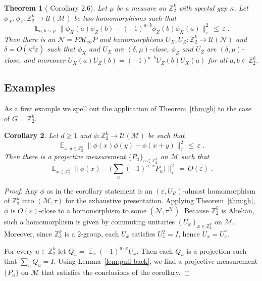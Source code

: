 \documentclass[11pt]{article}
\newtheorem{theorem}{Theorem}[section]
\newtheorem{corollary}[theorem]{Corollary}
\theoremstyle{definition}
\newcommand{\Id}{\ensuremath{I}}
\DeclareMathOperator*{\Expectation}{\mathbb{E}}
\newcommand{\Es}[1]{\Expectation_{#1}}
\newcommand{\C}{\ensuremath{\mathbb{C}}}
\newcommand{\Z}{\ensuremath{\mathbb{Z}}}
\newcommand{\mM}{\ensuremath{\mathcal{M}}}
\newcommand{\mU}{\ensuremath{\mathcal{U}}}
\newcommand{\eps}{\varepsilon}
\newcommand{\mN}{\mathcal{N}}
\begin{document}

\begin{theorem}[\cite{de2022spectral} Corollary 2.6]\label{thm:dls-gap}
Let $\mu$ be a measure on $\Z_2^k$ with spectal gap $\kappa$. Let $\phi_X,\phi_Z: \Z_2^k \to \mU(\mM)$ be two homomorphisms such that
\[ \Es{a,b\sim \mu} \big\| \phi_X(a)\phi_Z(b)-(-1)^{a\cdot b} \phi_Z(b)\phi_X(a)\big\|_\tau^2 \,\leq\,\eps\;.\]
Then there is an $\mN=P\mM_\infty P$ and homomorphisms $U_X,U_Z:\Z_2^k\to\mU(\mN)$ and $\delta=O(\kappa^2\eps)$ such that $\phi_X$ and $U_X$ are $(\delta,\mu)$-close, $\phi_Z$ and $U_Z$ are $(\delta,\mu)$-close, and moreover $U_X(a)U_Z(b)=(-1)^{a\cdot b}U_Z(b)U_X(a)$ for all $a,b\in\Z_2^k$.
\end{theorem}




\subsection{Examples}

As a first example we spell out the application of Theorem~\ref{thm:gh} to the case of $G=\Z_2^k$. 

\begin{corollary}\label{cor:lin-test} %
Let $d\geq 1$ and $\phi:\Z_2^k \to \mU(\mM)$ be such that 
\[ \Es{x,y\in \Z_2^k} \big\| \phi(x)\phi(y)-\phi(x+y) \big\|_{\tau}^2 \,\leq\,\eps\;.\]
Then there is a %
projective measurement $\{P_u\}_{u\in \Z_2^k}$ on $\mM$ such that 
\[ \Es{x\in \Z_2^k} \Big\| \phi(x) -\Big(\sum_u (-1)^{u\cdot x} P_u\Big)  \Big\|_{\tau}^2 \,=\, O(\eps)\;.\]
\end{corollary} 

\begin{proof}
Any $\phi$ as in the corollary statement is an $(\eps,U_R)$-almost homomorphism of $\Z_2^k$ into $(\mM,\tau)$ for the exhaustive presentation. Applying Theorem~\ref{thm:gh}, $\phi$ is $O(\eps)$-close to a homomorphism to some  $(\mN,\tau^\mN)$. Because $\Z_2^k$ is Abelian, such a homomorphism is given by commuting unitaries $(U_x)_{x\in\Z_2^k}$ on $\mM$. Moreover, since $\Z_2^k$ is a $2$-group, each $U_x$ satisfies $U_x^2=\Id$, hence $U_x=U_x^*$.

For every $u\in  \Z_2^k$ let $Q_u = \Es{x} (-1)^{u\cdot x} U_x$. Then each $Q_u$ is a projection such that $\sum_u Q_u=\Id$. Using Lemma~\ref{lem:pull-back}, we find a projective measurement $\{P_u\}$ on $\mM$ that satisfies the conclusions of the corollary. 
\end{proof}
\end{document}
